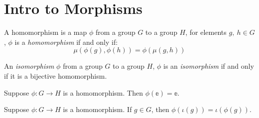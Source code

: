 \section{Intro to Morphisms}

\begin{definition}[Homomorphism]
    \label{definition : Homomorphism}
    \leanok
    A homomorphism is a map \( \phi \) from a group \( G \) to a group \( H \), for
    elements \( g,~ h \in G \), \( \phi \) is a
    \emph{homomorphism} if and only if:
    \[
        \mu(\phi(g),\phi(h)) = \phi(\mu(g,h))
    \]
\end{definition}

\begin{definition}[Isomorphism]
    \label{definition : Isomorphism}
    \leanok
    An \emph{isomorphism} \( \phi \) from a group \( G \) to a group \( H \), \( \phi
    \) is an \emph{isomorphism} if and only if it is a bijective homomorphism.
\end{definition}

\begin{theorem}
    \label{theorem : hom_id_to_id}
    \leanok
    Suppose \( \phi : G \rightarrow H \) is a homomorphism. Then \(
    \phi(\mathbb e) = \mathbb e \).
\end{theorem}

\begin{theorem}
    \label{theorem : hom_inv_to_inv}
    \leanok
    Suppose \( \phi : G \rightarrow H \) is a homomorphism. If \(g \in G \),
    then \( \phi(\iota(g)) = \iota(\phi(g)) \).
\end{theorem}
